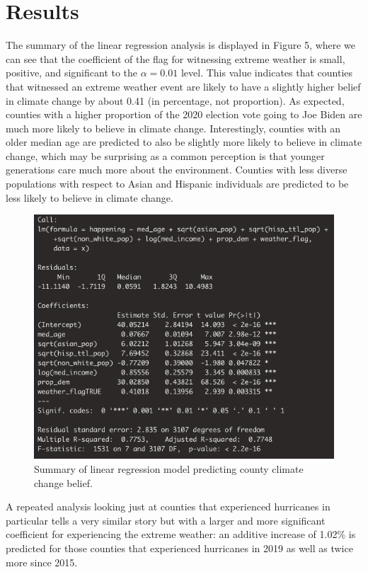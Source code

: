 \documentclass{article}
\begin{document}
\section{Results}
The summary of the linear regression analysis is displayed in Figure 5, where we can see that the coefficient of the flag for witnessing extreme weather is small, positive, and significant to the $\alpha = 0.01$ level. This value indicates that counties that witnessed an extreme weather event are likely to have a slightly higher belief in climate change by about 0.41 (in percentage, not proportion). As expected, counties with a higher proportion of the 2020 election vote going to Joe Biden are much more likely to believe in climate change. Interestingly, counties with an older median age are predicted to also be slightly more likely to believe in climate change, which may be surprising as a common perception is that younger generations care much more about the environment. Counties with less diverse populations with respect to Asian and Hispanic individuals are predicted to be less likely to believe in climate change. 

\begin{figure}[H]
\centering
\includegraphics[scale=0.4]{images/regression_summary.png}
\caption{Summary of linear regression model predicting county climate change belief.}
\end{figure}

A repeated analysis looking just at counties that experienced hurricanes in particular tells a very similar story but with a larger and more significant coefficient for experiencing the extreme weather: an additive increase of 1.02\% is predicted for those counties that experienced hurricanes in 2019 as well as twice more since 2015. 
\end{document}
